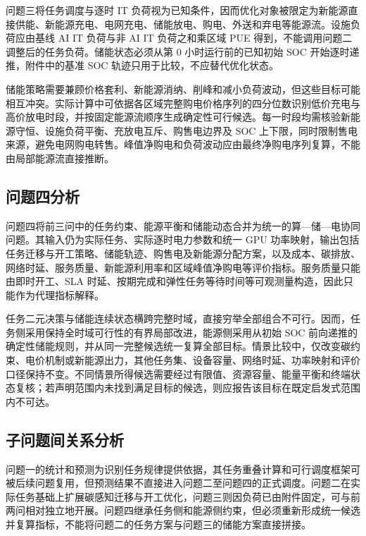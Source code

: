 问题三将任务调度与逐时 IT 负荷视为已知条件，因而优化对象被限定为新能源直接供能、新能源充电、电网充电、储能放电、购电、外送和弃电等能源流。设施负荷应由基线 AI IT 负荷与非 AI IT 负荷之和乘区域 PUE 得到，不能调用问题二调整后的任务负荷。储能状态必须从第 $0$ 小时运行前的已知初始 SOC 开始逐时递推，附件中的基准 SOC 轨迹只用于比较，不应替代优化状态。

储能策略需要兼顾价格套利、新能源消纳、削峰和减小负荷波动，但这些目标可能相互冲突。实际计算中可依据各区域完整购电价格序列的四分位数识别低价充电与高价放电时段，并按固定能源流顺序生成确定性可行候选。每一时段均需核验新能源守恒、设施负荷平衡、充放电互斥、购售电边界及 SOC 上下限，同时限制售电来源，避免电网购电转售。峰值净购电和负荷波动应由最终净购电序列复算，不能由局部能源流直接推断。

\subsection{问题四分析}

问题四将前三问中的任务约束、能源平衡和储能动态合并为统一的算—储—电协同问题。其输入仍为实际任务、实际逐时电力参数和统一 GPU 功率映射，输出包括任务迁移与开工策略、储能轨迹、购售电及新能源分配方案，以及成本、碳排放、网络时延、服务质量、新能源利用率和区域峰值净购电等评价指标。服务质量只能由即时开工、SLA 时延、按期完成和弹性任务等待时间等可观测量构造，因此只能作为代理指标解释。

任务二元决策与储能连续状态横跨完整时域，直接穷举全部组合不可行。因而，任务侧采用保持全时域可行性的有界局部改进，能源侧采用从初始 SOC 前向递推的确定性储能规则，并从同一完整候选统一复算全部目标。情景比较中，仅改变碳约束、电价机制或新能源出力，其他任务集、设备容量、网络时延、功率映射和评价口径保持不变。不同情景所得候选需要经过有限值、资源容量、能量平衡和终端状态复核；若声明范围内未找到满足目标的候选，则应报告该目标在既定启发式范围内不可达。

\subsection{子问题间关系分析}

问题一的统计和预测为识别任务规律提供依据，其任务重叠计算和可行调度框架可被后续问题复用，但预测结果不直接进入问题二至问题四的正式调度。问题二在实际任务基础上扩展碳感知迁移与开工优化，问题三则因负荷已由附件固定，可与前两问相对独立地开展。问题四继承任务侧和能源侧约束，但必须重新形成统一候选并复算指标，不能将问题二的任务方案与问题三的储能方案直接拼接。
